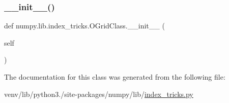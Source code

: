 \subsubsection{\texorpdfstring{\+\_\+\+\_\+init\+\_\+\+\_\+()}{\_\_init\_\_()}}
{\footnotesize\ttfamily def numpy.\+lib.\+index\+\_\+tricks.\+O\+Grid\+Class.\+\_\+\+\_\+init\+\_\+\+\_\+ (\begin{DoxyParamCaption}\item[{}]{self }\end{DoxyParamCaption})}



The documentation for this class was generated from the following file\+:\begin{DoxyCompactItemize}
\item 
venv/lib/python3./site-\/packages/numpy/lib/\hyperlink{lib_2index__tricks_8py}{index\+\_\+tricks.\+py}\end{DoxyCompactItemize}

